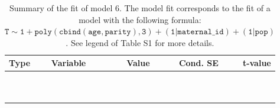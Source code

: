 \begin{table}

\caption{\label{tab:tab6}Summary of the fit of model 6. The model fit corresponds to the fit of a model with the following formula: {\small$\mathtt{T \sim 1 + poly(cbind(age, parity), 3) + (1 | maternal\_id) + (1 | pop)}$}. See legend of Table S1 for more details.}
\centering
\fontsize{8}{10}\selectfont
\begin{tabular}[t]{>{\raggedright\arraybackslash}p{3cm}>{\raggedright\arraybackslash}p{5cm}rrr}
\toprule
Type & Variable & Value & Cond. SE & t-value\\
\midrule
\cellcolor{gray!6}{fixed effects} & \cellcolor{gray!6}{$\beta_1$} & \cellcolor{gray!6}{-4.1} & \cellcolor{gray!6}{0.113} & \cellcolor{gray!6}{-36.4}\\
\cellcolor{gray!6}{} & \cellcolor{gray!6}{$\beta_{\mathtt{age}}$} & \cellcolor{gray!6}{73.7} & \cellcolor{gray!6}{31.1} & \cellcolor{gray!6}{2.37}\\
\cellcolor{gray!6}{} & \cellcolor{gray!6}{$\beta_{\mathtt{age}^2}$} & \cellcolor{gray!6}{-61.2} & \cellcolor{gray!6}{17.2} & \cellcolor{gray!6}{-3.55}\\
\cellcolor{gray!6}{} & \cellcolor{gray!6}{$\beta_{\mathtt{age}^3}$} & \cellcolor{gray!6}{-47.1} & \cellcolor{gray!6}{16.4} & \cellcolor{gray!6}{-2.87}\\
\cellcolor{gray!6}{} & \cellcolor{gray!6}{$\beta_{\mathtt{parity}}$} & \cellcolor{gray!6}{-0.936} & \cellcolor{gray!6}{40.1} & \cellcolor{gray!6}{-0.0233}\\
\cellcolor{gray!6}{} & \cellcolor{gray!6}{$\beta_{\mathtt{age}\times\mathtt{parity}}$} & \cellcolor{gray!6}{-4006} & \cellcolor{gray!6}{11890} & \cellcolor{gray!6}{-0.337}\\
\cellcolor{gray!6}{} & \cellcolor{gray!6}{$\beta_{\mathtt{age}^2\times\mathtt{parity}}$} & \cellcolor{gray!6}{7710} & \cellcolor{gray!6}{8669} & \cellcolor{gray!6}{0.889}\\
\cellcolor{gray!6}{} & \cellcolor{gray!6}{$\beta_{\mathtt{parity}^2}$} & \cellcolor{gray!6}{19} & \cellcolor{gray!6}{27.3} & \cellcolor{gray!6}{0.694}\\
\cellcolor{gray!6}{} & \cellcolor{gray!6}{$\beta_{\mathtt{age}\times\mathtt{parity}^2}$} & \cellcolor{gray!6}{-4380} & \cellcolor{gray!6}{8121} & \cellcolor{gray!6}{-0.539}\\
\cellcolor{gray!6}{} & \cellcolor{gray!6}{$\beta_{\mathtt{parity}^3}$} & \cellcolor{gray!6}{-18.6} & \cellcolor{gray!6}{14.1} & \cellcolor{gray!6}{-1.32}\\

\end{tabular}
\end{table}
